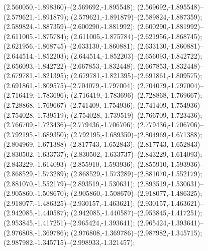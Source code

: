  (2.560050,-1.898360)--(2.569692,-1.895548);
 (2.569692,-1.895548)--(2.579621,-1.891879);
 (2.579621,-1.891879)--(2.589824,-1.887359);
 (2.589824,-1.887359)--(2.600290,-1.881992);
 (2.600290,-1.881992)--(2.611005,-1.875784);
 (2.611005,-1.875784)--(2.621956,-1.868745);
 (2.621956,-1.868745)--(2.633130,-1.860881);
 (2.633130,-1.860881)--(2.644514,-1.852203);
 (2.644514,-1.852203)--(2.656093,-1.842722);
 (2.656093,-1.842722)--(2.667853,-1.832448);
 (2.667853,-1.832448)--(2.679781,-1.821395);
 (2.679781,-1.821395)--(2.691861,-1.809575);
 (2.691861,-1.809575)--(2.704079,-1.797004);
 (2.704079,-1.797004)--(2.716419,-1.783696);
 (2.716419,-1.783696)--(2.728868,-1.769667);
 (2.728868,-1.769667)--(2.741409,-1.754936);
 (2.741409,-1.754936)--(2.754028,-1.739519);
 (2.754028,-1.739519)--(2.766709,-1.723436);
 (2.766709,-1.723436)--(2.779436,-1.706706);
 (2.779436,-1.706706)--(2.792195,-1.689350);
 (2.792195,-1.689350)--(2.804969,-1.671388);
 (2.804969,-1.671388)--(2.817743,-1.652843);
 (2.817743,-1.652843)--(2.830502,-1.633737);
 (2.830502,-1.633737)--(2.843229,-1.614093);
 (2.843229,-1.614093)--(2.855910,-1.593936);
 (2.855910,-1.593936)--(2.868529,-1.573289);
 (2.868529,-1.573289)--(2.881070,-1.552179);
 (2.881070,-1.552179)--(2.893519,-1.530631);
 (2.893519,-1.530631)--(2.905860,-1.508670);
 (2.905860,-1.508670)--(2.918077,-1.486325);
 (2.918077,-1.486325)--(2.930157,-1.463621);
 (2.930157,-1.463621)--(2.942085,-1.440587);
 (2.942085,-1.440587)--(2.953845,-1.417251);
 (2.953845,-1.417251)--(2.965424,-1.393641);
 (2.965424,-1.393641)--(2.976808,-1.369786);
 (2.976808,-1.369786)--(2.987982,-1.345715);
 (2.987982,-1.345715)--(2.998933,-1.321457);
